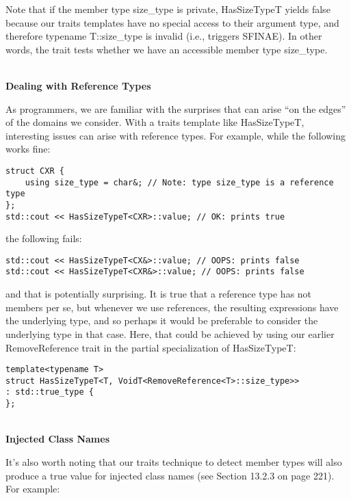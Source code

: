 Note that if the member type size\_type is private, HasSizeTypeT yields false because our traits templates have no special access to their argument type, and therefore typename T::size\_type is invalid (i.e., triggers SFINAE). In other words, the trait tests whether we have an accessible member type size\_type.

\hspace*{\fill} \\ %
\noindent
\textbf{Dealing with Reference Types}

As programmers, we are familiar with the surprises that can arise “on the edges” of the domains we consider. With a traits template like HasSizeTypeT, interesting issues can arise with reference types. For example, while the following works fine:

\begin{lstlisting}[style=styleCXX]
struct CXR {
	using size_type = char&; // Note: type size_type is a reference type
};
std::cout << HasSizeTypeT<CXR>::value; // OK: prints true
\end{lstlisting}

the following fails:

\begin{lstlisting}[style=styleCXX]
std::cout << HasSizeTypeT<CX&>::value; // OOPS: prints false
std::cout << HasSizeTypeT<CXR&>::value; // OOPS: prints false
\end{lstlisting}

and that is potentially surprising. It is true that a reference type has not members per se, but whenever we use references, the resulting expressions have the underlying type, and so perhaps it would be preferable to consider the underlying type in that case. Here, that could be achieved by using our earlier RemoveReference trait in the partial specialization of HasSizeTypeT:

\begin{lstlisting}[style=styleCXX]
template<typename T>
struct HasSizeTypeT<T, VoidT<RemoveReference<T>::size_type>>
: std::true_type {
};
\end{lstlisting}

\hspace*{\fill} \\ %
\noindent
\textbf{Injected Class Names}

It’s also worth noting that our traits technique to detect member types will also produce a true value for injected class names (see Section 13.2.3 on page 221). For example:


